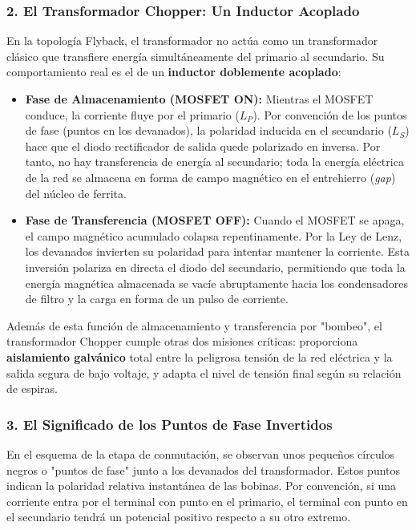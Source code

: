 \documentclass[12pt, a4paper]{article}
\begin{document}
\subsubsection*{2. El Transformador Chopper: Un Inductor Acoplado}
En la topología Flyback, el transformador no actúa como un transformador clásico que transfiere energía simultáneamente del primario al secundario. Su comportamiento real es el de un \textbf{inductor doblemente acoplado}:
\begin{itemize}
    \item \textbf{Fase de Almacenamiento (MOSFET ON):} Mientras el MOSFET conduce, la corriente fluye por el primario ($L_P$). Por convención de los puntos de fase (puntos en los devanados), la polaridad inducida en el secundario ($L_S$) hace que el diodo rectificador de salida quede polarizado en inversa. Por tanto, no hay transferencia de energía al secundario; toda la energía eléctrica de la red se almacena en forma de campo magnético en el entrehierro (\textit{gap}) del núcleo de ferrita.
    \item \textbf{Fase de Transferencia (MOSFET OFF):} Cuando el MOSFET se apaga, el campo magnético acumulado colapsa repentinamente. Por la Ley de Lenz, los devanados invierten su polaridad para intentar mantener la corriente. Esta inversión polariza en directa el diodo del secundario, permitiendo que toda la energía magnética almacenada se vacíe abruptamente hacia los condensadores de filtro y la carga en forma de un pulso de corriente.
\end{itemize}

Además de esta función de almacenamiento y transferencia por "bombeo", el transformador Chopper cumple otras dos misiones críticas: proporciona \textbf{aislamiento galvánico} total entre la peligrosa tensión de la red eléctrica y la salida segura de bajo voltaje, y adapta el nivel de tensión final según su relación de espiras.

\subsubsection*{3. El Significado de los Puntos de Fase Invertidos}
En el esquema de la etapa de conmutación, se observan unos pequeños círculos negros o "puntos de fase" junto a los devanados del transformador. Estos puntos indican la polaridad relativa instantánea de las bobinas. Por convención, si una corriente entra por el terminal con punto en el primario, el terminal con punto en el secundario tendrá un potencial positivo respecto a su otro extremo.
\end{document}
